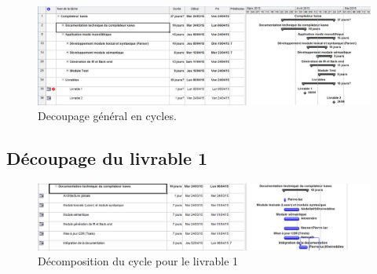 \documentclass{../res/univ-projet}
\begin{document}
    \begin{figure}[!h]
      \includegraphics[width=17.8cm]{img_Gantt/Gantt_Global.PNG}
      \caption{Decoupage général en cycles.}
      \label{decoupage_cycles}
    \end{figure}
    
    \subsection{Découpage du livrable 1}

      \begin{figure}[!h]
        \includegraphics[width=17.8cm]{img_Gantt/Gantt_Livrable1.PNG}
        \caption{Décomposition du cycle pour le livrable 1}
        \label{decomposition_cycle_livrable_1}
      \end{figure}
\end{document}
